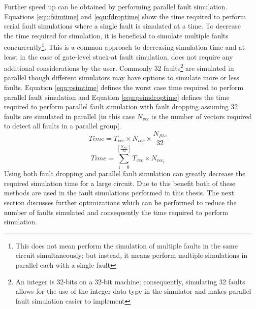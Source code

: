\documentclass[12pt]{report}
\begin{document}
Further speed up can be obtained by performing parallel fault simulation.  Equations \ref{equ:fsimtime} and \ref{equ:fdroptime} show the time required to perform serial fault simulations where a single fault is simulated at a time.  To decrease the time required for simulation, it is beneficial to simulate multiple faults concurrently\footnote{This does not mean perform the simulation of multiple faults in the same circuit simultaneously; but instead, it means perform multiple simulations in parallel each with a single fault\cite{parallelflts}}. This is a common approach to decreasing simulation time and at least in the case of gate-level stuck-at fault simulation, does not require any additional considerations by the user\cite{parallelflts}.  Commonly 32 faults\footnote{An integer is 32-bits on a 32-bit machine; consequently, simulating 32 faults allows for the use of the integer data type in the simulator and makes parallel fault simulation easier to implement\cite{parallelflts}} are simulated in parallel though different simulators may have options to simulate more or less faults\cite{parallelflts}.  Equation \ref{equ:psimtime} defines the worst case time required to perform parallel fault simulation and Equation \ref{equ:psimdroptime} defines the time required to perform parallel fault simulation with fault dropping assuming 32 faults are simulated in parallel (in this case $N_{vec}$ is the number of vectors required to detect all faults in a parallel group). 
\begin{equation}
Time = T_{vec} \times N_{vec} \times \frac{N_{flts}}{32}
\label{equ:psimtime}
\end{equation}
\begin{equation}
Time =  \sum_{i=0}^{[\frac{N_{flts}}{32}]} T_{vec} \times N_{vec_i}
\label{equ:psimdroptime}
\end{equation}
Using both fault dropping and parallel fault simulation can greatly decrease the required simulation time for a large circuit.  Due to this benefit both of these methods are used in the fault simulations performed in this thesis.  The next section discusses further optimizations which can be performed to reduce the number of faults simulated and consequently the time required to perform simulation.
\end{document}
